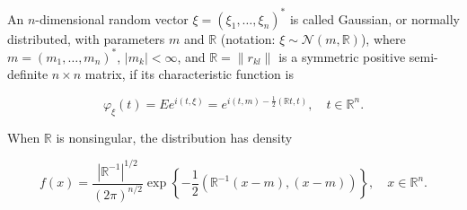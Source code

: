An $n$-dimensional random vector $\xi = (\xi_1, \ldots, \xi_n)^*$ is called Gaussian, or normally distributed, with parameters $m$ and $\mathbb{R}$ (notation: $\xi \sim \mathcal{N}(m, \mathbb{R})$), where $m = (m_1, \ldots, m_n)^*$, $|m_k| < \infty$, and $\mathbb{R} = \|r_{kl}\|$ is a symmetric positive semi-definite $n \times n$ matrix, if its characteristic function is

$$\varphi_\xi(t) = E e^{i(t,\xi)} = e^{i(t,m) - \frac{1}{2}(\mathbb{R}t, t)}, \quad t \in \mathbb{R}^n.$$

When $\mathbb{R}$ is nonsingular, the distribution has density

$$f(x) = \frac{|\mathbb{R}^{-1}|^{1/2}}{(2\pi)^{n/2}} \exp\left\{-\frac{1}{2}(\mathbb{R}^{-1}(x-m), (x-m))\right\}, \quad x \in \mathbb{R}^n.$$
